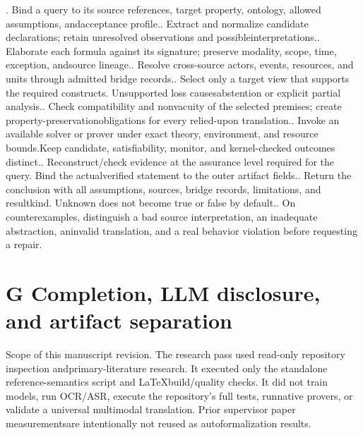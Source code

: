 . Bind a query to its source references, target property, ontology, allowed assumptions, and\linebreak[4]
acceptance profile.. Extract and normalize candidate declarations; retain unresolved observations and possible\linebreak[4]
interpretations.. Elaborate each formula against its signature; preserve modality, scope, time, exception, and\linebreak[4]
source lineage.. Resolve cross-source actors, events, resources, and units through admitted bridge records.. Select only a target view that supports the required constructs. Unsupported loss causes\linebreak[4]
abstention or explicit partial analysis.. Check compatibility and nonvacuity of the selected premises; create property-preservation\linebreak[4]
obligations for every relied-upon translation.. Invoke an available solver or prover under exact theory, environment, and resource bounds.\linebreak[4]
Keep candidate, satisfiability, monitor, and kernel-checked outcomes distinct.. Reconstruct/check evidence at the assurance level required for the query. Bind the actual\linebreak[4]
verified statement to the outer artifact fields.. Return the conclusion with all assumptions, sources, bridge records, limitations, and result\linebreak[4]
kind. Unknown does not become true or false by default.. On counterexamples, distinguish a bad source interpretation, an inadequate abstraction, an\linebreak[4]
invalid translation, and a real behavior violation before requesting a repair.\par

\section*{G  Completion, LLM disclosure, and artifact separation}
\noindent
Scope of this manuscript revision. The research pass used read-only repository inspection and\linebreak[4]
primary-literature research. It executed only the standalone reference-semantics script and LaTeX\linebreak[4]
build/quality checks. It did not train models, run OCR/ASR, execute the repository's full tests, run\linebreak[4]
native provers, or validate a universal multimodal translation. Prior supervisor paper measurements\linebreak[4]
are intentionally not reused as autoformalization results.\par

